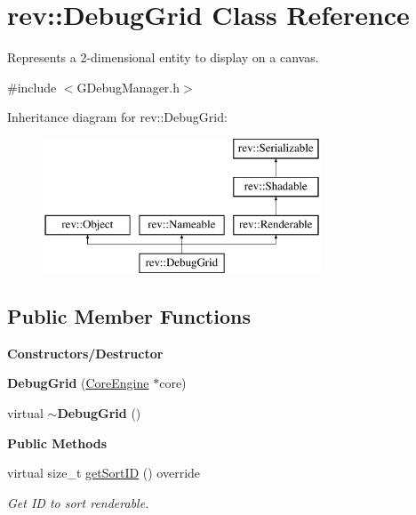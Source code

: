 \hypertarget{classrev_1_1_debug_grid}{}\section{rev\+::Debug\+Grid Class Reference}
\label{classrev_1_1_debug_grid}


Represents a 2-\/dimensional entity to display on a canvas.  




{\ttfamily \#include $<$G\+Debug\+Manager.\+h$>$}

Inheritance diagram for rev\+::Debug\+Grid\+:\begin{figure}[H]
\begin{center}
\leavevmode
\includegraphics[height=4.000000cm]{classrev_1_1_debug_grid}
\end{center}
\end{figure}
\subsection*{Public Member Functions}
\begin{Indent}\textbf{ Constructors/\+Destructor}\par
\begin{DoxyCompactItemize}
\item 
\mbox{\label{classrev_1_1_debug_grid_a05e4a9dd4dbb315d91216cbc92d2b8c9}} 
{\bfseries Debug\+Grid} (\mbox{\hyperlink{classrev_1_1_core_engine}{Core\+Engine}} $\ast$core)
\item 
\mbox{\label{classrev_1_1_debug_grid_a7d12070ee6b905a9b959bef8ecc41455}} 
virtual {\bfseries $\sim$\+Debug\+Grid} ()
\end{DoxyCompactItemize}
\end{Indent}
\begin{Indent}\textbf{ Public Methods}\par
\begin{DoxyCompactItemize}
\item 
\mbox{\label{classrev_1_1_debug_grid_a547dab00cca0b83656de852f0b4fcfe9}} 
virtual size\+\_\+t \mbox{\hyperlink{classrev_1_1_debug_grid_a547dab00cca0b83656de852f0b4fcfe9}{get\+Sort\+ID}} () override
\begin{DoxyCompactList}\small\item\em Get ID to sort renderable. \end{DoxyCompactList}\end{DoxyCompactItemize}
\end{Indent}
